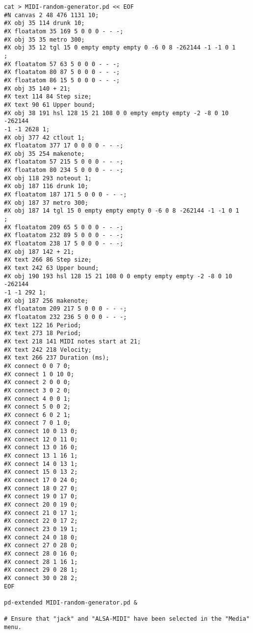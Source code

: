 \begin{verbatim}
cat > MIDI-random-generator.pd << EOF
#N canvas 2 48 476 1131 10;
#X obj 35 114 drunk 10;
#X floatatom 35 169 5 0 0 0 - - -;
#X obj 35 35 metro 300;
#X obj 35 12 tgl 15 0 empty empty empty 0 -6 0 8 -262144 -1 -1 0 1
;
#X floatatom 57 63 5 0 0 0 - - -;
#X floatatom 80 87 5 0 0 0 - - -;
#X floatatom 86 15 5 0 0 0 - - -;
#X obj 35 140 + 21;
#X text 114 84 Step size;
#X text 90 61 Upper bound;
#X obj 38 191 hsl 128 15 21 108 0 0 empty empty empty -2 -8 0 10 -262144
-1 -1 2628 1;
#X obj 377 42 ctlout 1;
#X floatatom 377 17 0 0 0 0 - - -;
#X obj 35 254 makenote;
#X floatatom 57 215 5 0 0 0 - - -;
#X floatatom 80 234 5 0 0 0 - - -;
#X obj 118 293 noteout 1;
#X obj 187 116 drunk 10;
#X floatatom 187 171 5 0 0 0 - - -;
#X obj 187 37 metro 300;
#X obj 187 14 tgl 15 0 empty empty empty 0 -6 0 8 -262144 -1 -1 0 1
;
#X floatatom 209 65 5 0 0 0 - - -;
#X floatatom 232 89 5 0 0 0 - - -;
#X floatatom 238 17 5 0 0 0 - - -;
#X obj 187 142 + 21;
#X text 266 86 Step size;
#X text 242 63 Upper bound;
#X obj 190 193 hsl 128 15 21 108 0 0 empty empty empty -2 -8 0 10 -262144
-1 -1 292 1;
#X obj 187 256 makenote;
#X floatatom 209 217 5 0 0 0 - - -;
#X floatatom 232 236 5 0 0 0 - - -;
#X text 122 16 Period;
#X text 273 18 Period;
#X text 218 141 MIDI notes start at 21;
#X text 242 218 Velocity;
#X text 266 237 Duration (ms);
#X connect 0 0 7 0;
#X connect 1 0 10 0;
#X connect 2 0 0 0;
#X connect 3 0 2 0;
#X connect 4 0 0 1;
#X connect 5 0 0 2;
#X connect 6 0 2 1;
#X connect 7 0 1 0;
#X connect 10 0 13 0;
#X connect 12 0 11 0;
#X connect 13 0 16 0;
#X connect 13 1 16 1;
#X connect 14 0 13 1;
#X connect 15 0 13 2;
#X connect 17 0 24 0;
#X connect 18 0 27 0;
#X connect 19 0 17 0;
#X connect 20 0 19 0;
#X connect 21 0 17 1;
#X connect 22 0 17 2;
#X connect 23 0 19 1;
#X connect 24 0 18 0;
#X connect 27 0 28 0;
#X connect 28 0 16 0;
#X connect 28 1 16 1;
#X connect 29 0 28 1;
#X connect 30 0 28 2;
EOF

pd-extended MIDI-random-generator.pd &

# Ensure that "jack" and "ALSA-MIDI" have been selected in the "Media" menu.
\end{verbatim}

